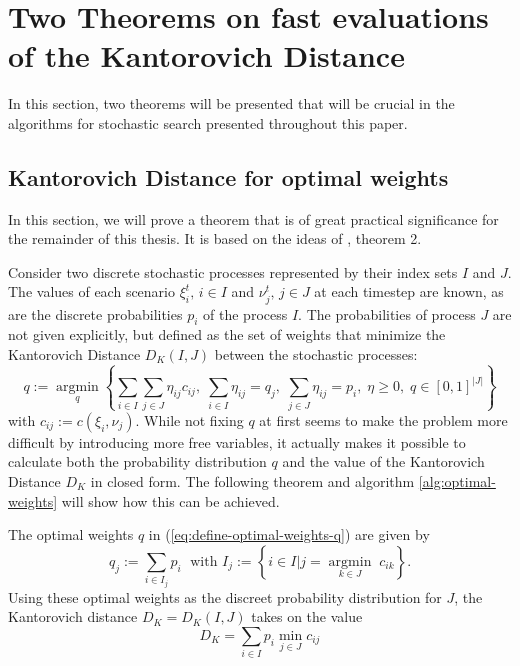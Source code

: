 \section{Two Theorems on fast evaluations of the Kantorovich Distance}
In this section, two theorems will be presented that will be crucial in the algorithms for stochastic search presented throughout this paper.
\subsection{Kantorovich Distance for optimal weights}
\label{sec:optimal-weights-proof}
In this section, we will prove a theorem that is of great practical significance for the remainder of this thesis. It is based on the ideas of \cite{Dupacova2003}, theorem 2. 

Consider two discrete stochastic processes represented by their index sets $I$ and $J$. The values of each scenario $\xi_i^t,\, i\in I$ and $\nu_j^t,\, j\in J$ at each timestep are known, as are the discrete probabilities $p_i$ of the process $I$. The probabilities of process $J$ are not given explicitly, but defined as the set of weights that minimize the Kantorovich Distance $D_K(I,J)$ between the stochastic processes:
\begin{equation}
  \label{eq:define-optimal-weights-q}
  q := \underset{q}{\operatorname{argmin}}\left\{\sum_{i\in I}\sum_{j\in J}\eta_{ij}c_{ij},\; \sum_{i\in I}\eta_{ij} = q_j,\; \sum_{j\in J}\eta_{ij} = p_i,\;\eta\geq 0,\; q\in \left[0,1\right]^{|J|} \right\}
\end{equation}
with $c_{ij} := c(\xi_i,\nu_j)$.
While not fixing $q$ at first seems to make the problem more difficult by introducing more free variables, it actually makes it possible to calculate both the probability distribution $q$ and the value of the Kantorovich Distance $D_K$ in closed form.
The following theorem and algorithm \ref{alg:optimal-weights} will show how this can be achieved.
\begin{thm}
  \label{thm:optimal-weights}
  The optimal weights $q$ in (\ref{eq:define-optimal-weights-q}) are given by
  \begin{equation}
    \label{eq:optimal-weights-in-thm}
    q_j := \sum_{i\in I_j} p_i\;\text{ with } I_j:=\left\{i\in I| j = \underset{k\in J}{\operatorname{argmin}}\; c_{ik}\right\}.
  \end{equation}
  Using these optimal weights as the discreet probability distribution for $J$, the Kantorovich distance $D_K=D_K(I,J)$ takes on the value
  \begin{equation}
    \label{eq:define-Dk-optimalweights-thm}
    D_K = \sum_{i\in I}p_i\min\limits_{j\in J}c_{ij}
  \end{equation}
\end{thm}
